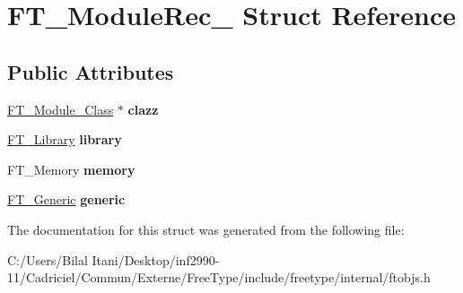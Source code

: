 \hypertarget{struct_f_t___module_rec__}{}\section{F\+T\+\_\+\+Module\+Rec\+\_\+ Struct Reference}
\label{struct_f_t___module_rec__}
\subsection*{Public Attributes}
\begin{DoxyCompactItemize}
\item 
\hyperlink{struct_f_t___module___class__}{F\+T\+\_\+\+Module\+\_\+\+Class} $\ast$ {\bfseries clazz}\hypertarget{struct_f_t___module_rec___ac762573dc13af2d2af190a9e855742f5}{}\label{struct_f_t___module_rec___ac762573dc13af2d2af190a9e855742f5}

\item 
\hyperlink{struct_f_t___library_rec__}{F\+T\+\_\+\+Library} {\bfseries library}\hypertarget{struct_f_t___module_rec___ac3d04fbdc2988bf9a39f4ad6d3cb4b5f}{}\label{struct_f_t___module_rec___ac3d04fbdc2988bf9a39f4ad6d3cb4b5f}

\item 
F\+T\+\_\+\+Memory {\bfseries memory}\hypertarget{struct_f_t___module_rec___a33113e9eb2d6cd8ee6666da75ff8e108}{}\label{struct_f_t___module_rec___a33113e9eb2d6cd8ee6666da75ff8e108}

\item 
\hyperlink{struct_f_t___generic__}{F\+T\+\_\+\+Generic} {\bfseries generic}\hypertarget{struct_f_t___module_rec___a860be13b9f239c42cacdbc5d6f81d44a}{}\label{struct_f_t___module_rec___a860be13b9f239c42cacdbc5d6f81d44a}

\end{DoxyCompactItemize}


The documentation for this struct was generated from the following file\+:\begin{DoxyCompactItemize}
\item 
C\+:/\+Users/\+Bilal Itani/\+Desktop/inf2990-\/11/\+Cadriciel/\+Commun/\+Externe/\+Free\+Type/include/freetype/internal/ftobjs.\+h\end{DoxyCompactItemize}
